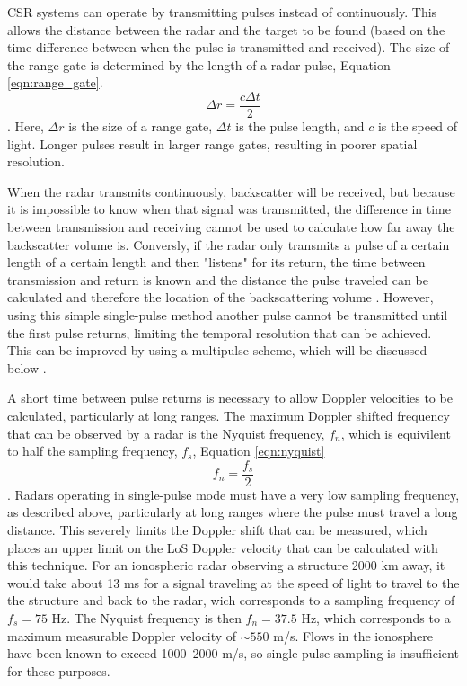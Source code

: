 CSR systems can operate by transmitting pulses instead of continuously.  This allows the distance between the radar and the target to be found (based on the time difference between when the pulse is transmitted and received).  The size of the range gate is determined by the length of a radar pulse, Equation \ref{eqn:range_gate}.\
\begin{equation}
	\label{eqn:range_gate}
	\Delta r = \frac{c\Delta t}{2}
\end{equation}.
Here, \(\Delta r\) is the size of a range gate, \(\Delta t\) is the pulse length, and \(c\) is the speed of light.  Longer pulses result in larger range gates, resulting in poorer spatial resolution.

When the radar transmits continuously, backscatter will be received, but because it is impossible to know when that signal was transmitted, the difference in time between transmission and receiving cannot be used to calculate how far away the backscatter volume is.  Conversly, if the radar only transmits a pulse of a certain length of a certain length and then "listens" for its return, the time between transmission and return is known and the distance the pulse traveled can be calculated and therefore the location of the backscattering volume \citep{Farley1972,Greenwald1983}.  However, using this simple single-pulse method another pulse cannot be transmitted until the first pulse returns, limiting the temporal resolution that can be achieved.  This can be improved by using a multipulse scheme, which will be discussed below \citep{Farley1972,Greenwald1983,Greenwald1985}.

A short time between pulse returns is necessary to allow Doppler velocities to be calculated, particularly at long ranges.  The maximum Doppler shifted frequency that can be observed by a radar is the Nyquist frequency, \(f_n\), which is equivilent to half the sampling frequency, \(f_s\), Equation \ref{eqn:nyquist}
\begin{equation}	
	\label{eqn:nyquist}
	f_n = \frac{f_s}{2}
\end{equation}.
Radars operating in single-pulse mode must have a very low sampling frequency, as described above, particularly at long ranges where the pulse must travel a long distance.  This severely limits the Doppler shift that can be measured, which places an upper limit on the LoS Doppler velocity that can be calculated with this technique.  For an ionospheric radar observing a structure 2000 km away, it would take about 13 ms for a signal traveling at the speed of light to travel to the the structure and back to the radar, wich corresponds to a sampling frequency of \(f_s = 75\) Hz.  The Nyquist frequency is then \(f_n = 37.5\) Hz, which corresponds to a maximum measurable Doppler velocity of \(\sim550\) m/s.  Flows in the ionosphere have been known to exceed 1000--2000 m/s, so single pulse sampling is insufficient for these purposes.

